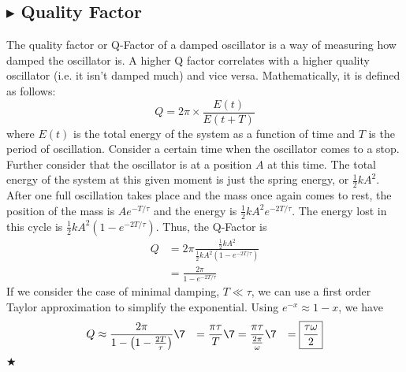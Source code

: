 \subsection{\color{Orchid} $\blacktriangleright$ \color{black} Quality Factor}
The quality factor or Q-Factor of a damped oscillator is a way of measuring how damped the oscillator is. A higher Q factor correlates with a higher quality oscillator (i.e. it isn't damped much) and vice versa. Mathematically, it is defined as follows:
\begin{equation}
    Q = 2\pi \times \frac{E(t)}{E(t+T)}
\end{equation}
\noindent where $E(t)$ is the total energy of the system as a function of time and $T$ is the period of oscillation. Consider a certain time when the oscillator comes to a stop. Further consider that the oscillator is at a position $A$ at this time. The total energy of the system at this given moment is just the spring energy, or $\frac12 k A^2$. After one full oscillation takes place and the mass once again comes to rest, the position of the mass is $Ae^{-T/\tau}$ and the energy is $\frac12 k A^2 e^{-2T/\tau}$. The energy lost in this cycle is $\frac12 k A^2\left(1-e^{-2T/\tau}\right)$. Thus, the Q-Factor is 
\begin{align*}
    Q &= 2\pi\frac{\frac12 kA^2}{\frac12 k A^2\left(1-e^{-2T/\tau}\right)} \\
    &= \frac{2\pi}{1-e^{-2T/\tau}}
\end{align*}
\noindent If we consider the case of minimal damping, $T \ll \tau$, we can use a first order Taylor approximation to simplify the exponential. Using $e^{-x} \approx 1-x$, we have
\begin{align}
    Q &\approx \frac{2\pi}{1-\left(1-\frac{2T}{\tau}\right)} \7
    &= \frac{\pi\tau}{T} \7
    &= \frac{\pi\tau}{\frac{2\pi}{\omega}} \7
    &= \boxed{\frac{\tau\omega}{2}}
\end{align}
$\bigstar$

%
%
